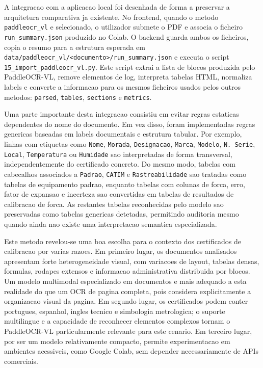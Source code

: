 A integracao com a aplicacao local foi desenhada de forma a preservar a
arquitetura comparativa ja existente. No frontend, quando o metodo
\texttt{paddleocr\_vl} e selecionado, o utilizador submete o PDF e associa o
ficheiro \texttt{run\_summary.json} produzido no Colab. O backend guarda ambos os
ficheiros, copia o resumo para a estrutura esperada em
\texttt{data/paddleocr\_vl/<documento>/run\_summary.json} e executa o script
\texttt{15\_import\_paddleocr\_vl.py}. Este script extrai a lista de blocos
produzida pelo PaddleOCR-VL, remove elementos de log, interpreta tabelas HTML,
normaliza labels e converte a informacao para os mesmos ficheiros usados pelos
outros metodos: \texttt{parsed}, \texttt{tables}, \texttt{sections} e
\texttt{metrics}.

Uma parte importante desta integracao consistiu em evitar regras estaticas
dependentes do nome do documento. Em vez disso, foram implementadas regras
genericas baseadas em labels documentais e estrutura tabular. Por exemplo, linhas
com etiquetas como \texttt{Nome}, \texttt{Morada}, \texttt{Designacao},
\texttt{Marca}, \texttt{Modelo}, \texttt{N. Serie}, \texttt{Local},
\texttt{Temperatura} ou \texttt{Humidade} sao interpretadas de forma transversal,
independentemente do certificado concreto. Do mesmo modo, tabelas com cabecalhos
associados a \texttt{Padrao}, \texttt{CATIM} e \texttt{Rastreabilidade} sao
tratadas como tabelas de equipamento padrao, enquanto tabelas com colunas de
forca, erro, fator de expansao e incerteza sao convertidas em tabelas de
resultados de calibracao de forca. As restantes tabelas reconhecidas pelo modelo
sao preservadas como tabelas genericas detetadas, permitindo auditoria mesmo
quando ainda nao existe uma interpretacao semantica especializada.

Este metodo revelou-se uma boa escolha para o contexto dos certificados de
calibracao por varias razoes. Em primeiro lugar, os documentos analisados
apresentam forte heterogeneidade visual, com variacoes de layout, tabelas densas,
formulas, rodapes extensos e informacao administrativa distribuida por blocos. Um
modelo multimodal especializado em documentos e mais adequado a esta realidade do
que um OCR de pagina completa, pois considera explicitamente a organizacao visual
da pagina. Em segundo lugar, os certificados podem conter portugues, espanhol,
ingles tecnico e simbologia metrologica; o suporte multilingue e a capacidade de
reconhecer elementos complexos tornam o PaddleOCR-VL particularmente relevante
para este cenario. Em terceiro lugar, por ser um modelo relativamente compacto,
permite experimentacao em ambientes acessiveis, como Google Colab, sem depender
necessariamente de APIs comerciais.

